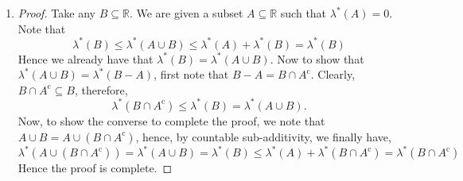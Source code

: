\documentclass{article}
\theoremstyle{definition}
\theoremstyle{remark}
\theoremstyle{definition}
\theoremstyle{definition}
\theoremstyle{definition}
\newcommand{\union}{\cup}
\newcommand{\intrs}{\cap}
\newcommand{\bunion}{\bigcup}
\newcommand{\bintrs}{\bigcap}
\newcommand{\R}{\mathbb{R}}
\newcommand{\N}{\mathbb{N}}
\newcommand{\comp}[1]{#1^{\text{c}}}
\newcommand{\lom}[1]{\lambda^*\left (#1\right )}
\newcommand{\set}[1]{\mathscr{#1}}
\begin{document}
\begin{enumerate}
{\begin{proof}
		\begin{equation*}
			\begin{split}
				\lom{G\setminus E} &\le \lom{O_m \setminus E}\\
				&= \lom{O_m} - \lom{E}\;\;\;\;\text{(Since $ E\subseteq O_m $)}\\
				&\le \frac{1}{n}
			\end{split}
		\end{equation*} 
 		for all $ n\in \N $. Therefore $ \lom{G\setminus E} = 0 $ which implies that 
 		\[\lom{G} = \lom{E}\]
 		as $ E\subseteq G $. 
\end{proof}}
\item {\begin{proof}
		Take any $ B\subseteq \R $. We are given a subset $ A\subseteq \R $ such that $ \lom{A} = 0 $. Note that 
		\[\lom{B}\le \lom{A\union B}\le \lom{A} + \lom{B} = \lom{B}\]
		Hence we already have that $ \lom{B}= \lom{A\union B} $. Now to show that $ \lom{A\union B} = \lom{B- A} $, first note that $ B-A = B\intrs \comp{A} $. Clearly, $ B\intrs \comp{A} \subseteq B $, therefore,
		\[\lom{B\intrs \comp{A}}\le \lom{B} = \lom{A\union B}.\]
		Now, to show the converse to complete the proof, we note that $ A\union B = A \union (B\intrs \comp{A}) $, hence, by countable sub-additivity, we finally have,
		\[\lom{A\union (B\intrs \comp{A})} = \lom{A\union B} = \lom{B} \le \lom{A} + \lom{B\intrs \comp{A}} = \lom{B\intrs \comp{A}}\]
		Hence the proof is complete.

\end{proof}}
\end{enumerate}
\end{document}
